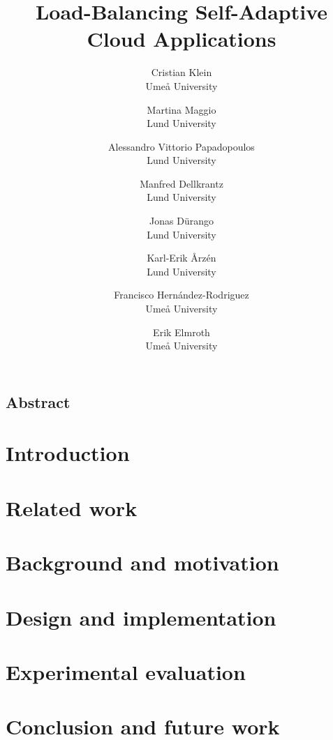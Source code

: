 \documentclass[letterpaper,twocolumn,10pt]{article}
\begin{document}
\date{}
\title{\Large \bf Load-Balancing Self-Adaptive Cloud Applications}

\author{
{\rm Cristian Klein}\\
Ume{\aa} University
\and
{\rm Martina Maggio}\\
Lund University
\and
{\rm Alessandro Vittorio Papadopoulos}\\
Lund University
\and
{\rm Manfred Dellkrantz}\\
Lund University
\and
{\rm Jonas D{\"u}rango}\\
Lund University
\and
{\rm Karl-Erik {\AA}rz\'en}\\
Lund University
\and
{\rm Francisco Hern{\'a}ndez-Rodriguez}\\
Ume{\aa} University
\and
{\rm Erik Elmroth}\\
Ume{\aa} University
} %

\maketitle



\subsection*{Abstract}


\section{Introduction}
\label{sec:Introduction}


\section{Related work}
\label{sec:Related}


\section{Background and motivation}
\label{sec:ProblemStatement}


\section{Design and implementation}
\label{sec:Solution}


\section{Experimental evaluation}
\label{sec:Results}


\section{Conclusion and future work}
\label{sec:Conclusion}


\printbibliography
\end{document}
